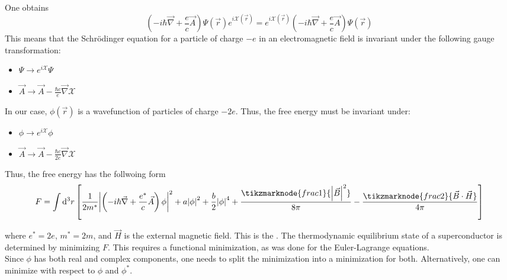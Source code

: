 \documentclass[12pt,a4paper,titlepage]{article}
\newcommand{\ul}[1]{\underline{\smash{#1}}} %
\newcommand{\Chi}{\mathcal{X}} %
\begin{document}
One obtains
\begin{equation}
\left(-i\hbar\vec{\nabla}+\frac{e}{c}\vec{A}\right)\Psi(\vec{r})e^{i\Chi(\vec{r})}=e^{i\Chi(\vec{r})}\left(-i\hbar\vec{\nabla}+\frac{e}{c}\vec{A}\right)\Psi(\vec{r})
\end{equation}
This means that the Schr\"{o}dinger equation for a particle of charge $-e$ in an electromagnetic field is invariant under the following gauge transformation:
\begin{itemize}
\item[] $\Psi\rightarrow e^{i\Chi}\Psi$
\item[] $\vec{A}\rightarrow\vec{A}-\frac{\hbar c}{e}\vec{\nabla}\Chi$
\end{itemize}
In our case, $\phi(\vec{r})$ is a wavefunction of particles of charge $-2e$. Thus, the free energy must be invariant under:
\begin{itemize}
\item[] $\phi\rightarrow e^{i\Chi}\phi$
\item[] $\vec{A}\rightarrow\vec{A}-\frac{\hbar c}{2e}\vec{\nabla}\Chi$
\end{itemize}
Thus, the free energy has the follwoing form
\begin{equation}
F=\int\dd[3]{r}\left[\frac{1}{2m^{*}}\abs{\left(-i\hbar\vec{\nabla}+\frac{e^{*}}{c}\vec{A}\right)\phi}^{2}+a\abs{\phi}^{2}+\frac{b}{2}\abs{\phi}^{4}+\frac{\tikzmarknode{frac1}{\abs{\vec{B}}^{2}}}{8\pi}-\frac{\tikzmarknode{frac2}{\vec{B}\cdot\vec{H}}}{4\pi}\right]
\end{equation}
where $e^{*}=2e$, $m^{*}=2m$, and $\vec{H}$ is the external magnetic field. This is the \ul{Ginzburg-Landau free energy}. The thermodynamic equilibrium state of a superconductor is determined by minimizing $F$. This requires a functional minimization, as was done for the Euler-Lagrange equations.\\

Since $\phi$ has both real and complex components, one needs to split the minimization into a minimization for both. Alternatively, one can minimize with respect to $\phi$ and $\phi^{*}$.
\begin{equation}
\end{equation}
\end{document}
